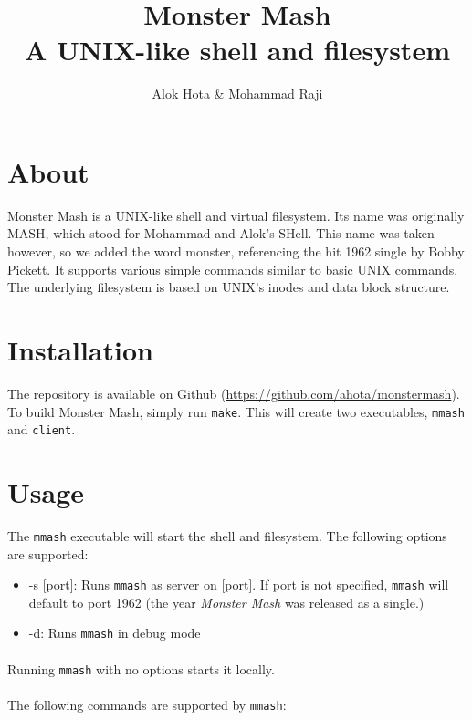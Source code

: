 \documentclass[]{article}
\title{\color{darkgray} Monster Mash \\ \large \color{lightgray} A UNIX-like shell and filesystem }
\author{Alok Hota \& Mohammad Raji}
\begin{document}
\maketitle

\pagebreak
{}

\color{body}
\section{About}
Monster Mash is a UNIX-like shell and virtual filesystem. Its name was originally MASH, which stood for Mohammad and Alok's SHell. This name was taken however, so we added the word monster, referencing the hit 1962 single by Bobby Pickett. It supports various simple commands similar to basic UNIX commands. The underlying filesystem is based on UNIX's inodes and data block structure. 

\section{Installation}
The repository is available on Github (\url{https://github.com/ahota/monstermash}). To build Monster Mash, simply run \texttt{make}. This will create two executables, \texttt{mmash} and \texttt{client}. 

\section{Usage}
The \texttt{mmash} executable will start the shell and filesystem. The following options are supported:

\begin{itemize}
	\item -s [port]: Runs \texttt{mmash} as server on [port]. If port is not specified, \texttt{mmash} will default to port 1962 (the year \textit{Monster Mash} was released as a single.)
	\item -d: Runs \texttt{mmash} in debug mode
\end{itemize}

\paragraph{}
Running \texttt{mmash} with no options starts it locally.

\paragraph{}
The following commands are supported by \texttt{mmash}: 
\end{document}
